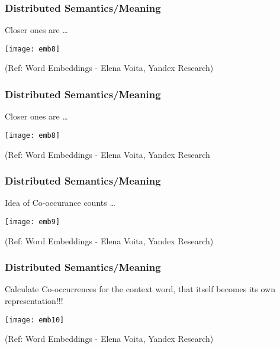 \begin{frame}[fragile]\frametitle{Distributed Semantics/Meaning}
Closer ones are \ldots

\begin{center}
\texttt{[image: emb8]}
\end{center}

{\tiny (Ref: Word Embeddings - Elena Voita, Yandex Research)}
\end{frame}

\begin{frame}[fragile]\frametitle{Distributed Semantics/Meaning}
Closer ones are \ldots

\begin{center}
\texttt{[image: emb8]}
\end{center}

{\tiny (Ref: Word Embeddings - Elena Voita, Yandex Research}
\end{frame}

\begin{frame}[fragile]\frametitle{Distributed Semantics/Meaning}
Idea of Co-occurance counts \ldots

\begin{center}
\texttt{[image: emb9]}
\end{center}

{\tiny (Ref: Word Embeddings - Elena Voita, Yandex Research)}
\end{frame}

\begin{frame}[fragile]\frametitle{Distributed Semantics/Meaning}
Calculate Co-occurrences for the context word, that itself becomes its own representation!!!

\begin{center}
\texttt{[image: emb10]}
\end{center}

{\tiny (Ref: Word Embeddings - Elena Voita, Yandex Research)}
\end{frame}




